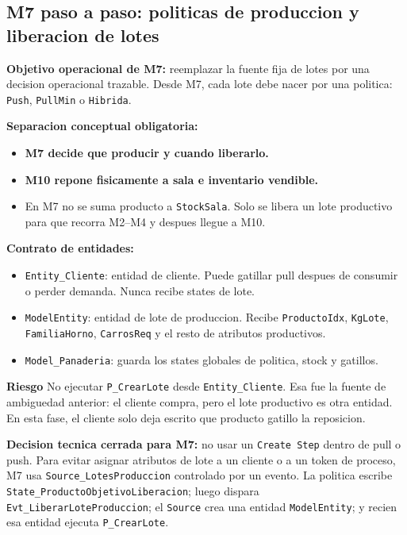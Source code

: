 \documentclass[11pt]{article}
\newcommand{\simio}[1]{\texttt{#1}}
\newcommand{\state}[1]{\texttt{#1}}
\newcommand{\proc}[1]{\texttt{#1}}
\newcommand{\risk}{\textcolor{rojoriesgo}{\textbf{Riesgo}}}
\begin{document}
\subsection{M7 paso a paso: politicas de produccion y liberacion de lotes}
\textbf{Objetivo operacional de M7:} reemplazar la fuente fija de lotes por una decision operacional trazable. Desde M7, cada lote debe nacer por una politica: \simio{Push}, \simio{PullMin} o \simio{Hibrida}.

\textbf{Separacion conceptual obligatoria:}
\begin{itemize}
  \item \textbf{M7 decide que producir y cuando liberarlo.}
  \item \textbf{M10 repone fisicamente a sala e inventario vendible.}
  \item En M7 no se suma producto a \state{StockSala}. Solo se libera un lote productivo para que recorra M2--M4 y despues llegue a M10.
\end{itemize}

\textbf{Contrato de entidades:}
\begin{itemize}
  \item \simio{Entity\_Cliente}: entidad de cliente. Puede gatillar pull despues de consumir o perder demanda. Nunca recibe states de lote.
  \item \simio{ModelEntity}: entidad de lote de produccion. Recibe \state{ProductoIdx}, \state{KgLote}, \state{FamiliaHorno}, \state{CarrosReq} y el resto de atributos productivos.
  \item \simio{Model\_Panaderia}: guarda los states globales de politica, stock y gatillos.
\end{itemize}

\risk{} No ejecutar \proc{P\_CrearLote} desde \simio{Entity\_Cliente}. Esa fue la fuente de ambiguedad anterior: el cliente compra, pero el lote productivo es otra entidad. En esta fase, el cliente solo deja escrito que producto gatillo la reposicion.

\textbf{Decision tecnica cerrada para M7:} no usar un \simio{Create Step} dentro de pull o push. Para evitar asignar atributos de lote a un cliente o a un token de proceso, M7 usa \simio{Source\_LotesProduccion} controlado por un evento. La politica escribe \state{State\_ProductoObjetivoLiberacion}; luego dispara \simio{Evt\_LiberarLoteProduccion}; el \simio{Source} crea una entidad \simio{ModelEntity}; y recien esa entidad ejecuta \proc{P\_CrearLote}.
\end{document}
